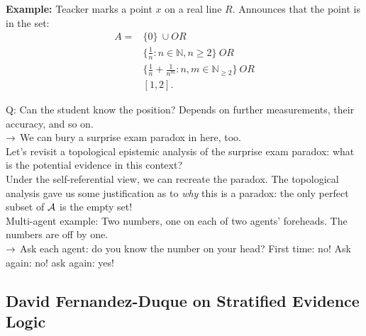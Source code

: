 {\bf Example:} Teacker marks a point $x$ on a real line $R$. Announces that the point is in the set:
\begin{align}
A = &\{0\}\ \cup OR\\
&\{\frac{1}{n} : n \in \mathbb{N}, n \geq 2\}\ OR \\ &\{\frac{1}{n} + \frac{1}{n^m} : n,m \in \mathbb{N}_{\geq 2}\}\ OR\\
&[1,2].
\end{align}

Q: Can the student know the position? Depends on further measurements, their accuracy, and so on. \\

$\rightarrow$ We can bury a surprise exam paradox in here, too. \\

Let's revisit a topological epistemic analysis of the surprise exam paradox: what is the potential evidence in this context? \\

Under the self-referential view, we can recreate the paradox. The topological analysis gave us some justification as to {\it why} this is a paradox: the only perfect subset of $\mathcal{A}$ is the empty set! \\

Multi-agent example: Two numbers, one on each of two agents' foreheads. The numbers are off by one. \\

$\rightarrow$ Ask each agent: do you know the number on your head? First time: no! Ask again: no! ask again: yes!


\spacerule
\subsection{David Fernandez-Duque on Stratified Evidence Logic}





